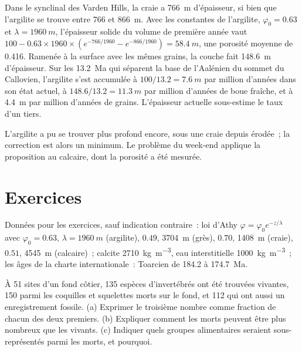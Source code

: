 \begin{example}\label{ex:b2:palaeoenvironments:shale}
Dans le synclinal des Varden Hills, la craie a \qty{766}{m} d'épaisseur, si bien que l'argilite se trouve entre
766 et \qty{866}{m}. Avec les constantes de l'argilite, $\varphi_0 = 0.63$ et $\lambda =
\qty{1960}{m}$, l'épaisseur solide du volume de première année vaut $100 - 0.63 \times 1960 \times
(e^{-766/1960} - e^{-866/1960}) = \qty{58.4}{m}$, une porosité moyenne de 0.416. Ramenée à la
surface avec les mêmes grains, la couche fait \qty{148.6}{m} d'épaisseur. Sur les \qty{13.2}{Ma} qui séparent
la base de l'Aalénien du sommet du Callovien, l'argilite s'est accumulée à $100/13.2 =
\qty{7.6}{m}$ par million d'années dans son état actuel, à $148.6/13.2 = \qty{11.3}{m}$ par million
d'années de boue fraîche, et à \qty{4.4}{m} par million d'années de grains. L'épaisseur actuelle
sous-estime le taux d'un tiers.
\end{example}

L'argilite a pu se trouver plus profond encore, sous une craie
depuis érodée~; la correction est alors un minimum. Le problème du week-end
applique la proposition au calcaire, dont la porosité a été mesurée.

\section*{Exercices}\label{sec:b2:palaeoenvironments:exercises}

Données pour les exercices, sauf indication contraire~: loi d'Athy
$\varphi = \varphi_0 e^{-z/\lambda}$ avec $\varphi_0 = 0.63$, $\lambda = \qty{1960}{m}$ (argilite),
$0.49$, \qty{3704}{m} (grès), $0.70$, \qty{1408}{m} (craie), $0.51$, \qty{4545}{m}
(calcaire)~; calcite \qty{2710}{kg.m^{-3}}, eau interstitielle \qty{1000}{kg.m^{-3}}~;
les âges de la charte internationale~: Toarcien de 184.2 à \qty{174.7}{Ma}.

\begin{exercise}[$\star$]\label{exo:b2:palaeoenvironments:1}
À 51 sites d'un fond côtier, 135 espèces d'invertébrés ont été trouvées vivantes, 150 parmi les coquilles et
squelettes morts sur le fond, et 112 qui ont aussi un enregistrement fossile. (a) Exprimer le troisième nombre
comme fraction de chacun des deux premiers. (b) Expliquer comment les morts peuvent être plus nombreux que
les vivants. (c) Indiquer quels groupes alimentaires seraient sous-représentés parmi les morts, et pourquoi.
\end{exercise}

